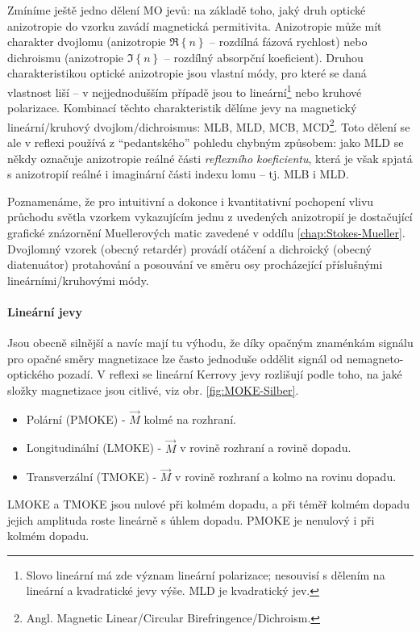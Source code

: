 Zmíníme ještě jedno dělení MO jevů: na základě toho, jaký druh optické anizotropie do vzorku zavádí magnetická permitivita\cite{zvezdinModernMagnetoopticsMagnetooptical1997}.
Anizotropie může mít charakter dvojlomu (anizotropie $\Re\left\lbrace n\right\rbrace$ -- rozdílná fázová rychlost) nebo dichroismu (anizotropie $\Im\left\lbrace n \right\rbrace$ -- rozdílný absorpční koeficient).
Druhou charakteristikou optické anizotropie jsou vlastní módy, pro které se daná vlastnost liší -- v nejjednodušším případě jsou to lineární\footnote{Slovo lineární má zde význam lineární polarizace; nesouvisí s dělením na lineární a kvadratické jevy výše. MLD je kvadratický jev.} nebo kruhové polarizace.
Kombinací těchto charakteristik dělíme jevy na magnetický lineární/kruhový dvojlom/dichroismus: MLB, MLD, MCB, MCD\footnote{Angl. Magnetic Linear/Circular Birefringence/Dichroism.}.
Toto dělení se ale v reflexi používá z ``pedantského'' pohledu chybným způsobem: jako MLD se někdy označuje anizotropie reálné části \emph{reflexního koeficientu}, která je však spjatá s anizotropií reálné i imaginární části indexu lomu -- tj. MLB i MLD\cite{tesarovaSystematicStudyMagnetic2014}.

Poznamenáme, že pro intuitivní a dokonce i kvantitativní pochopení vlivu průchodu světla vzorkem vykazujícím jednu z uvedených anizotropií je dostačující grafické znázornění Muellerových matic zavedené v oddílu \ref{chap:Stokes-Mueller}.
Dvojlomný vzorek (obecný retardér) provádí otáčení a dichroický (obecný diatenuátor) protahování a posouvání ve směru osy procházející příslušnými lineárními/kruhovými módy.

\paragraph{Lineární jevy}

Jsou obecně silnější a navíc mají tu výhodu, že díky opačným znaménkám signálu pro opačné směry magnetizace lze často jednoduše oddělit signál od nemagneto-optického pozadí.
V reflexi se lineární Kerrovy jevy rozlišují podle toho, na jaké složky magnetizace jsou citlivé, viz obr. \ref{fig:MOKE-Silber}\cite{silberQuadraticMagnetoopticKerr2019a}.
\begin{itemize}
    \item Polární (PMOKE) - $\vec{M}$ kolmé na rozhraní.
    \item Longitudinální (LMOKE) - $\vec{M}$ v rovině rozhraní a rovině dopadu.
    \item Transverzální (TMOKE) - $\vec{M}$ v rovině rozhraní a kolmo na rovinu dopadu.
\end{itemize}
LMOKE a TMOKE jsou nulové při kolmém dopadu, a při téměř kolmém dopadu jejich amplituda roste lineárně s úhlem dopadu.
PMOKE je nenulový i při kolmém dopadu.

